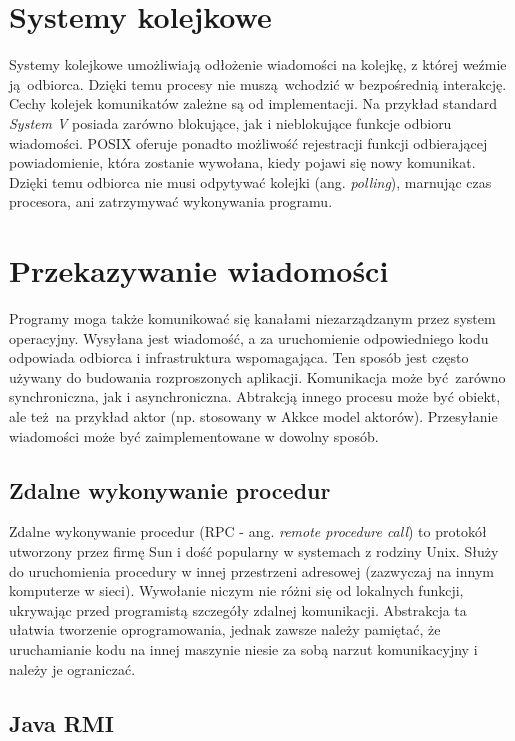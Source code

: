 \section{Systemy kolejkowe}

Systemy kolejkowe umożliwiają odłożenie wiadomości na kolejkę, z której weźmie ją odbiorca. Dzięki temu procesy nie muszą wchodzić w bezpośrednią interakcję. Cechy kolejek komunikatów zależne są od implementacji. Na przykład standard \textit{System V} posiada zarówno blokujące, jak i nieblokujące funkcje odbioru wiadomości. POSIX oferuje ponadto możliwość rejestracji funkcji odbierającej powiadomienie, która zostanie wywołana, kiedy pojawi się nowy komunikat. Dzięki temu odbiorca nie musi odpytywać kolejki (ang. \textit{polling}), marnując czas procesora, ani zatrzymywać wykonywania programu.


\section{Przekazywanie wiadomości}

Programy moga także komunikować się kanałami niezarządzanym przez system operacyjny. Wysyłana jest wiadomość, a za uruchomienie odpowiedniego kodu odpowiada odbiorca i infrastruktura wspomagająca. Ten sposób jest często używany do budowania rozproszonych aplikacji. Komunikacja może być zarówno synchroniczna, jak i asynchroniczna. Abtrakcją innego procesu może być obiekt, ale też na przykład aktor (np. stosowany w Akkce\cite{akka} model aktorów). Przesyłanie wiadomości może być zaimplementowane w dowolny sposób.


\subsection{Zdalne wykonywanie procedur}

Zdalne wykonywanie procedur (RPC - ang. \textit{remote procedure call}) to protokół utworzony przez firmę Sun\cite{rpc} i dość popularny w systemach z rodziny Unix. Służy do uruchomienia procedury w innej przestrzeni adresowej (zazwyczaj na innym komputerze w sieci). Wywołanie niczym nie różni się od lokalnych funkcji, ukrywając przed programistą szczegóły zdalnej komunikacji. Abstrakcja ta ułatwia tworzenie oprogramowania, jednak zawsze należy pamiętać, że uruchamianie kodu na innej maszynie niesie za sobą narzut komunikacyjny i należy je ograniczać.


\subsection{Java RMI}

